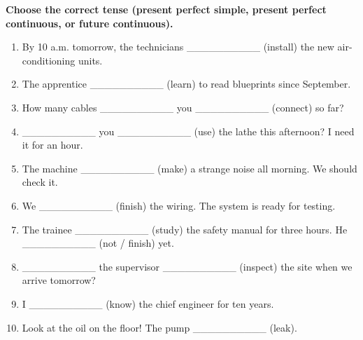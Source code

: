 \documentclass[11pt]{article}
\begin{document}
\begin{exercice}
\textbf{Choose the correct tense (present perfect simple, present perfect continuous, or future continuous).}
\begin{enumerate}
    \item By 10 a.m. tomorrow, the technicians \_\_\_\_\_\_\_\_\_\_ (install) the new air-conditioning units.
    \item The apprentice \_\_\_\_\_\_\_\_\_\_ (learn) to read blueprints since September.
    \item How many cables \_\_\_\_\_\_\_\_\_\_ you \_\_\_\_\_\_\_\_\_\_ (connect) so far?
    \item \_\_\_\_\_\_\_\_\_\_ you \_\_\_\_\_\_\_\_\_\_ (use) the lathe this afternoon? I need it for an hour.
    \item The machine \_\_\_\_\_\_\_\_\_\_ (make) a strange noise all morning. We should check it.
    \item We \_\_\_\_\_\_\_\_\_\_ (finish) the wiring. The system is ready for testing.
    \item The trainee \_\_\_\_\_\_\_\_\_\_ (study) the safety manual for three hours. He \_\_\_\_\_\_\_\_\_\_ (not / finish) yet.
    \item \_\_\_\_\_\_\_\_\_\_ the supervisor \_\_\_\_\_\_\_\_\_\_ (inspect) the site when we arrive tomorrow?
    \item I \_\_\_\_\_\_\_\_\_\_ (know) the chief engineer for ten years.
    \item Look at the oil on the floor! The pump \_\_\_\_\_\_\_\_\_\_ (leak).
\end{enumerate}
\end{exercice}
\end{document}
